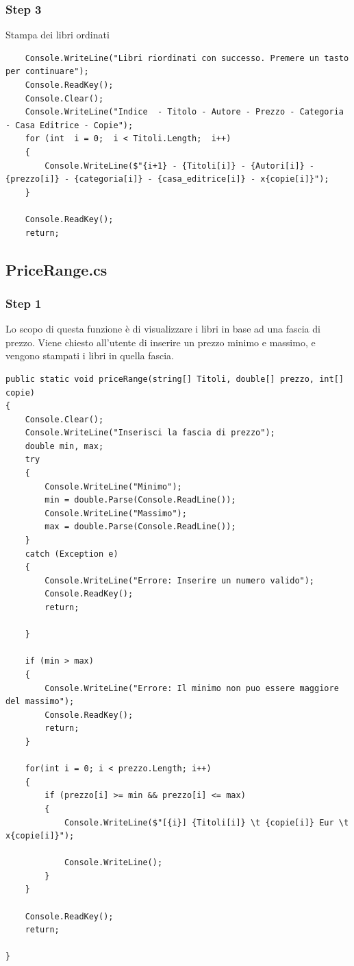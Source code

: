 \documentclass[a4paper,12pt]{article}
\begin{document}
\subsubsection{Step 3}
Stampa dei libri ordinati
\begin{lstlisting}
    Console.WriteLine("Libri riordinati con successo. Premere un tasto per continuare");
    Console.ReadKey();
    Console.Clear();
    Console.WriteLine("Indice  - Titolo - Autore - Prezzo - Categoria - Casa Editrice - Copie");
    for (int  i = 0;  i < Titoli.Length;  i++)
    {
        Console.WriteLine($"{i+1} - {Titoli[i]} - {Autori[i]} - {prezzo[i]} - {categoria[i]} - {casa_editrice[i]} - x{copie[i]}");
    }

    Console.ReadKey();
    return;
\end{lstlisting}

\newpage

\subsection{PriceRange.cs}

\subsubsection{Step 1}
Lo scopo di questa funzione è di visualizzare i libri in base ad una fascia di prezzo.
Viene chiesto all'utente di inserire un prezzo minimo e massimo, e vengono stampati i libri in quella fascia.

\begin{lstlisting}
public static void priceRange(string[] Titoli, double[] prezzo, int[] copie)
{
    Console.Clear();
    Console.WriteLine("Inserisci la fascia di prezzo");
    double min, max;
    try
    {
        Console.WriteLine("Minimo");
        min = double.Parse(Console.ReadLine());
        Console.WriteLine("Massimo");
        max = double.Parse(Console.ReadLine());
    }
    catch (Exception e)
    {
        Console.WriteLine("Errore: Inserire un numero valido");
        Console.ReadKey();
        return;

    }

    if (min > max)
    {
        Console.WriteLine("Errore: Il minimo non puo essere maggiore del massimo");
        Console.ReadKey();
        return;
    }

    for(int i = 0; i < prezzo.Length; i++)
    {
        if (prezzo[i] >= min && prezzo[i] <= max)
        {
            Console.WriteLine($"[{i}] {Titoli[i]} \t {copie[i]} Eur \t x{copie[i]}");
                    
            Console.WriteLine();
        }
    }

    Console.ReadKey();
    return;

}
\end{lstlisting}
\end{document}
